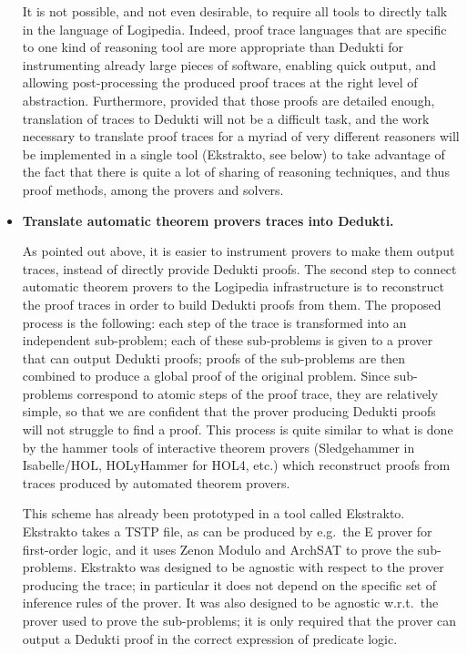 \begin{itemize}
It is not possible, and not even desirable, to require all tools to
directly talk in the language of Logipedia.  Indeed, proof trace
languages that are specific to one kind of reasoning tool are more
appropriate than Dedukti for instrumenting already large pieces of
software, enabling quick output, and allowing post-processing the
produced proof traces at the right level of abstraction.
Furthermore, provided that those proofs are detailed enough,
translation of traces to Dedukti will not be a difficult task, and
the work necessary to translate proof traces for a myriad of very
different reasoners will be implemented in a single tool (Ekstrakto,
see below) to take advantage of the fact that there is quite a lot of
sharing of reasoning techniques, and thus proof methods, among the
provers and solvers.

\item{\bf Translate automatic theorem provers traces into Dedukti.}
  
As pointed out above, it is easier to instrument provers to make them
output traces, instead of directly provide Dedukti proofs. The second
step to connect automatic theorem provers to the Logipedia
infrastructure is to reconstruct the proof traces in order to build
Dedukti proofs from them. The proposed process is the following: each
step of the trace is transformed into an independent sub-problem; each
of these sub-problems is given to a prover that can output Dedukti
proofs; proofs of the sub-problems are then combined to produce a
global proof of the original problem.  Since sub-problems correspond
to atomic steps of the proof trace, they are relatively simple, so
that we are confident that the prover producing Dedukti proofs will
not struggle to find a proof. This process is quite similar to what is
done by the hammer tools of interactive theorem provers (Sledgehammer
in Isabelle/HOL, HOLyHammer for HOL4, etc.) which reconstruct proofs
from traces produced by automated theorem provers.

This scheme has already been prototyped in a tool called
Ekstrakto. Ekstrakto takes a TSTP file, as can be produced by
e.g.\ the E prover for first-order logic, and it uses Zenon Modulo and
ArchSAT to prove the sub-problems. Ekstrakto was designed to be
agnostic with respect to the prover producing the trace; in particular
it does not depend on the specific set of inference rules of the
prover. It was also designed to be agnostic w.r.t.\ the prover used to
prove the sub-problems; it is only required that the prover can output
a Dedukti proof in the correct expression of predicate logic.


\end{itemize}
